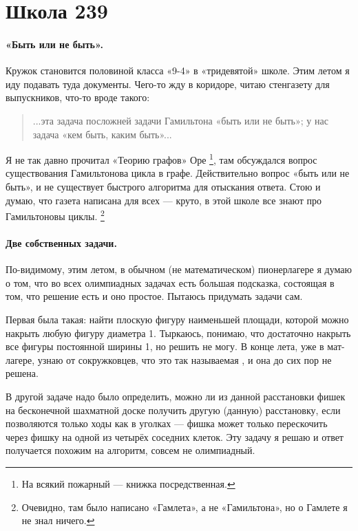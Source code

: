 \documentclass{book}
\begin{document}
\section*{Школа 239}



\paragraph{«Быть или не быть».}
Кружок становится половиной класса «9-4» 
в «тридевятой» школе.
Этим летом я иду подавать туда документы.
Чего-то жду в коридоре, читаю стенгазету для выпускников, что-то вроде такого:
\begin{verse}
...эта задача посложней задачи Гамильтона «быть или не быть»;
у нас задача «кем быть, каким быть»...
\end{verse}
Я не так давно прочитал  «Теорию графов» Оре%
\footnote{На всякий пожарный --- книжка посредственная.},
там обсуждался вопрос существования Гамильтонова цикла в графе.
Действительно вопрос «быть или не быть»,
и не существует быстрого алгоритма для отыскания ответа.
Стою и думаю, что газета написана для всех --- круто, в этой школе все знают про Гамильтоновы циклы.%
\footnote{Очевидно, там было написано «Гамлета», а не «Гамильтона», но о Гамлете я не знал ничего.}

\paragraph{Две собственных задачи.}
По-видимому, этим летом, в обычном (не математическом)
пионерлагере я думаю о том, что во всех олимпиадных задачах
есть большая подсказка, состоящая в том, что решение есть и оно простое.
Пытаюсь придумать задачи сам.

Первая была такая: найти плоскую фигуру наименьшей площади,
которой можно накрыть любую фигуру диаметра 1.
Тыркаюсь, понимаю, что достаточно накрыть все фигуры постоянной ширины 1, но решить не могу.
В конце лета, уже в мат-лагере, узнаю от сокружковцев,
что это так называемая , и она до сих пор не решена.

В другой задаче надо было определить, можно ли из данной расстановки фишек на бесконечной шахматной доске 
получить другую (данную) расстановку, если позволяются только ходы как в уголках 
--- фишка может только перескочить через фишку на одной из четырёх соседних клеток.
Эту задачу я решаю и ответ получается похожим на алгоритм, 
совсем не олимпиадный.
\end{document}
